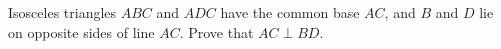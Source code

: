 Isosceles triangles $ABC$ and $ADC$ have the common base $AC$, and $B$ and $D$ lie on opposite sides of line $AC$. Prove that $AC\perp BD$.
